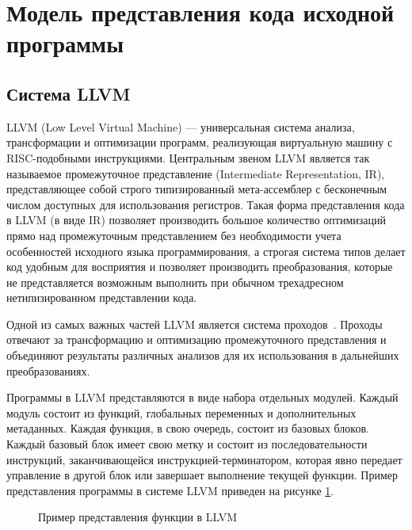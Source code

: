 \section{Модель представления кода исходной программы}

\subsection{Система LLVM}
LLVM (Low Level Virtual Machine) --- универсальная система анализа, трансформации и оптимизации программ, реализующая виртуальную машину с RISC-подобными инструкциями. Центральным звеном LLVM является так называемое промежуточное представление (Intermediate Representation, IR), представляющее собой строго типизированный мета-ассемблер с бесконечным числом доступных для использования регистров.  Такая форма представления кода в LLVM (в виде IR) позволяет производить большое количество оптимизаций прямо над промежуточным представлением без необходимости учета особенностей исходного языка программирования, а строгая система типов делает код удобным для восприятия и позволяет производить преобразования, которые не представляется возможным выполнить при обычном трехадресном нетипизированном представлении кода.

Одной из самых важных частей LLVM является система проходов~\cite{llvmpass}. Проходы отвечают за трансформацию и оптимизацию промежуточного представления и объединяют результаты различных анализов для их использования в дальнейших преобразованиях.

Программы в LLVM представляются в виде набора отдельных модулей. Каждый модуль состоит из функций, глобальных переменных и дополнительных метаданных. Каждая функция, в свою очередь, состоит из базовых блоков. Каждый базовый блок имеет свою метку и состоит из последовательности инструкций, заканчивающейся инструкцией-терминатором, которая явно передает управление в другой блок или завершает выполнение текущей функции. Пример представления программы в системе LLVM приведен на рисунке \ref{image:llvmIR}.
\begin{figure}[h!]
\caption{Пример представления функции в LLVM}
\label{image:llvmIR}
\end{figure}
	
